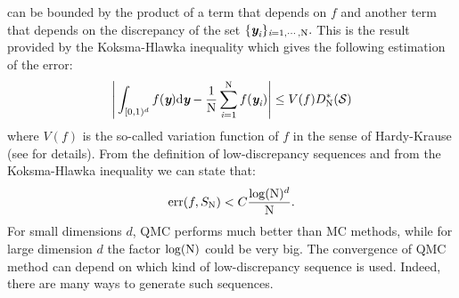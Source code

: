  can be bounded by the product of a term that depends on $f$ and another term that depends on the discrepancy of the set $\{\textit{\textbf{y}}_{\textit{i}}\}_{\textit{i}=1, \cdots, \textrm{N}}.$ This is the result provided by the Koksma-Hlawka inequality which gives the following estimation of the error:
\begin{equation}
\Bigg|\int_{[0,1)^d}f(\textit{\textbf{y}}) \textrm{d}\textit{\textbf{y}}-\frac{1}{\textrm{N}}\sum_{\textit{i}=1}^{\textrm{N}}f(\textit{\textbf{y}}_{\textit{i}})\Bigg|\leq V(f)D^*_{\textrm{N}}({\mathcal{S}})
\end{equation}
where $V(f)$ is the so-called variation function of $f$ in the sense of Hardy-Krause (see \cite{brandolini2013koksma,owen2005multidimensional} for details). From the definition of low-discrepancy sequences and from the Koksma-Hlawka inequality we can state that:
\begin{equation}
\textrm{err}(f, S_{\textrm{N}})<C \frac{\log(\textrm{N})^d}{\textrm{N}}.
\end{equation}
For small dimensions $d$, QMC performs much better than MC methods, while for large dimension $d$ the factor $\log(\textrm{N})$ could be very big. 
The convergence of QMC method can depend on which kind of low-discrepancy sequence is used. Indeed, there are many ways to generate such sequences.
